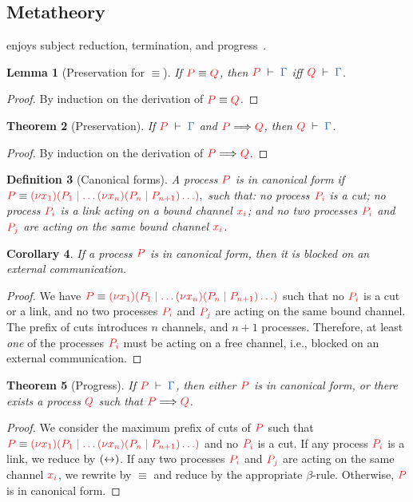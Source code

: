 \documentclass[submission,copyright,creativecommons]{eptcs}
\newtheorem{lemma}{Lemma}[section]
\newtheorem{theorem}[lemma]{Theorem}
\newtheorem{corollary}[lemma]{Corollary}
\newtheorem{definition}[lemma]{Definition}
\begin{document}
\subsection{Metatheory}
\cp enjoys subject reduction, termination, and progress~\citep{wadler2012}.
\begin{lemma}[Preservation for $\equiv$]\label{lem:cp-preservation-equiv}
  If $\tm{P}\equiv\tm{Q}$, then $\seq[P]{\Gamma}$ iff $\seq[Q]{\Gamma}$.
\end{lemma} 
\begin{proof}
  By induction on the derivation of $\tm{P}\equiv\tm{Q}$.
\end{proof}
\begin{theorem}[Preservation]\label{thm:cp-preservation}
  If $\seq[P]{\Gamma}$ and $\reducesto{P}{Q}$, then $\seq[Q]{\Gamma}$.
\end{theorem} 
\begin{proof}
  By induction on the derivation of $\reducesto{P}{Q}$.
\end{proof}
\begin{definition}[Canonical forms]
  A process $\tm{P}$ is in canonical form if
  \(
    \tm{P} \equiv \tm{\cpCut{x_1}{P_1}{\dots\cpCut{x_n}{P_n}{P_{n+1}}\dots}},
  \)
  such that: no process $\tm{P_i}$ is a cut; no process $\tm{P_i}$ is a link acting on a bound channel $\tm{x_i}$; and no two processes $\tm{P_i}$ and $\tm{P_j}$ are acting on the same bound channel $\tm{x_i}$.
\end{definition}
\begin{corollary}
  If a process $\tm{P}$ is in canonical form, then it is blocked on an external communication.
\end{corollary}
\begin{proof}
  We have $\tm{P} \equiv \tm{\cpCut{x_1}{P_1}{\dots\cpCut{x_n}{P_n}{P_{n+1}}\dots}}$ such that no $\tm{P_i}$ is a cut or a link, and no two processes $\tm{P_i}$ and $\tm{P_j}$ are acting on the same bound channel. The prefix of cuts introduces $n$ channels, and $n+1$ processes. Therefore, at least \emph{one} of the processes $\tm{P_i}$ must be acting on a free channel, i.e., blocked on an external communication.
\end{proof}
\begin{theorem}[Progress]\label{thm:cp-progress}
  If $\seq[P]{\Gamma}$, then either $\tm{P}$ is in canonical form, or there exists a process $\tm{Q}$ such that $\tm{P}\Longrightarrow\tm{Q}$.
\end{theorem} 
\begin{proof}
  We consider the maximum prefix of cuts of $\tm{P}$ such that $\tm{P} \equiv \tm{\cpCut{x_1}{P_1}{\dots\cpCut{x_n}{P_n}{P_{n+1}}\dots}}$ and no $\tm{P_i}$ is a cut. If any process $\tm{P_i}$ is a link, we reduce by $({\leftrightarrow})$. If any two processes $\tm{P_i}$ and $\tm{P_j}$ are acting on the same channel $\tm{x_i}$, we rewrite by $\equiv$ and reduce by the appropriate $\beta$-rule. Otherwise, $\tm{P}$ is in canonical form.
\end{proof}
\end{document}
